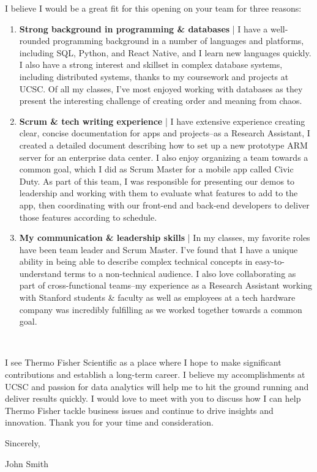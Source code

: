 \documentclass[11pt]{article}
\begin{document}
I believe I would be a great fit for this opening on your team for three reasons:
\begin{enumerate}
    \item \textbf{Strong background in programming \& databases } | I have a well-rounded programming background in a number of languages and platforms, including SQL, Python, and React Native, and I learn new languages quickly. I also have a strong interest and skillset in complex database systems, including distributed systems, thanks to my coursework and projects at UCSC. Of all my classes, I've most enjoyed working with databases as they present the interesting challenge of creating order and meaning from chaos.
    \item \textbf{Scrum \& tech writing experience} | I have extensive experience creating clear, concise documentation for apps and projects--as a Research Assistant, I created a detailed document describing how to set up a new prototype ARM server for an enterprise data center. I also enjoy organizing a team towards a common goal, which I did as Scrum Master for a mobile app called Civic Duty. As part of this team, I was responsible for presenting our demos to leadership and working with them to evaluate what features to add to the app, then coordinating with our front-end and back-end developers to deliver those features according to schedule.
    \item \textbf{My communication \& leadership skills} | In my classes, my favorite roles have been team leader and Scrum Master. I've found that I have a unique ability in being able to describe complex technical concepts in easy-to-understand terms to a non-technical audience. I also love collaborating as part of cross-functional teams--my experience as a Research Assistant working with Stanford students \& faculty as well as employees at a tech hardware company was incredibly fulfilling as we worked together towards a common goal.
\end{enumerate} \\

\vspace{.3em}


I see Thermo Fisher Scientific as a place where I hope to make significant contributions and establish a long-term career. I believe my accomplishments at UCSC and passion for data analytics will help me to hit the ground running and deliver results quickly. I would love to meet with you to discuss how I can help Thermo Fisher tackle business issues and continue to drive insights and innovation. Thank you for your time and consideration. \\

\vspace{.3em}


\hfill Sincerely,

\hfill John Smith\\
\end{document}
